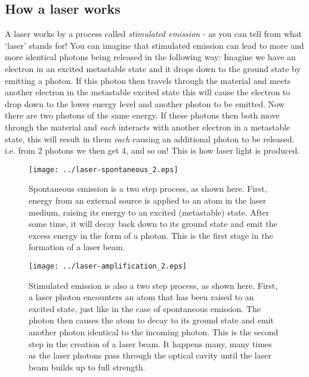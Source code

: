 \subsection{How a laser works}
A laser works by a process called \textit{stimulated emission} - as you can tell from what `laser' stands for! 
You can imagine that stimulated emission can lead to more and more identical photons being released in the following way: Imagine we have an electron in an excited metastable state and it drops down to the ground state by emitting a photon. If this photon then travels through the material and meets another electron in the metastable excited state this will cause the electron to drop down to the lower energy level and another photon to be emitted. Now there are two photons of the same energy. If these photons then both move through the material and \textit{each} interacts with another electron in a metastable state, this will result in them \textit{each} causing an additional photon to be released. i.e. from 2 photons we then get 4, and so on! This is how laser light is produced.

\begin{figure}[!h]
\begin{center}
\texttt{[image: ../laser-spontaneous\_2.eps]}
\end{center}
\caption{Spontaneous emission is a two step process, as shown here.  First, energy from an external source is applied to an atom in the laser medium, raising its energy to an excited (metastable) state.  After some time, it will decay back down to its ground state and emit the excess energy in the form of a photon.  This is the first stage in the formation of a laser beam. }
\label{laserse}
\end{figure}

\begin{figure}[!h]
\begin{center}
\texttt{[image: ../laser-amplification\_2.eps]}
\end{center}
\caption{Stimulated emission is also a two step process, as shown here.  First, a laser photon encounters an atom that has been raised to an excited state, just like in the case of spontaneous emission.  The photon then causes the atom to decay to its ground state and emit another photon identical to the incoming photon.  This is the second step in the creation of a laser beam.  It happens many, many times as the laser photons pass through the optical cavity until the laser beam builds up to full strength.}
\label{laseramp}
\end{figure}



